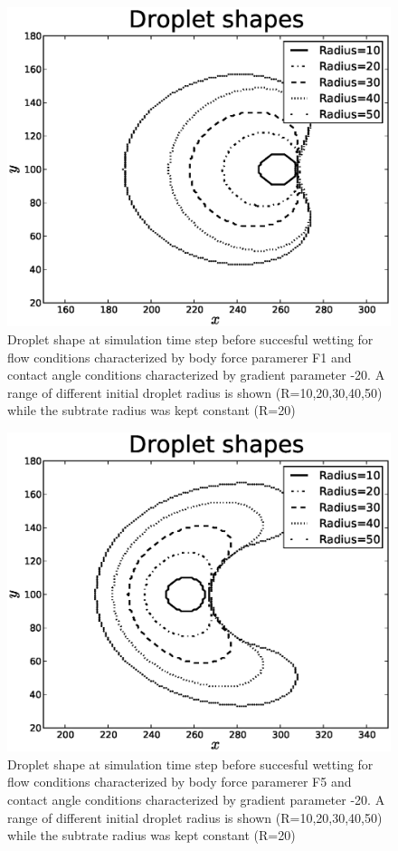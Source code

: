 \documentclass{article}
\begin{document}
\begin{figure}[h!]
\includegraphics[width=1\textwidth]{Figures/shapes_F1_Grad-20.eps}
\caption{Droplet shape at simulation time step before succesful wetting for flow conditions characterized by body force paramerer F1 and contact angle conditions characterized by gradient parameter -20. A range of different initial droplet radius is shown (R=10,20,30,40,50) while the subtrate radius was kept constant (R=20)  \label{fig:droplet:shapes:curved:substrate:F1}}
\end{figure}

\begin{figure}[h!]
\includegraphics[width=1\textwidth]{Figures/shapes_F5_Grad-20.eps}
\caption{Droplet shape at simulation time step before succesful wetting for flow conditions characterized by body force paramerer F5 and contact angle conditions characterized by gradient parameter -20. A range of different initial droplet radius is shown (R=10,20,30,40,50) while the subtrate radius was kept constant (R=20)  \label{fig:droplet:shapes:curved:substrate:F5}}
\end{figure}
\end{document}
